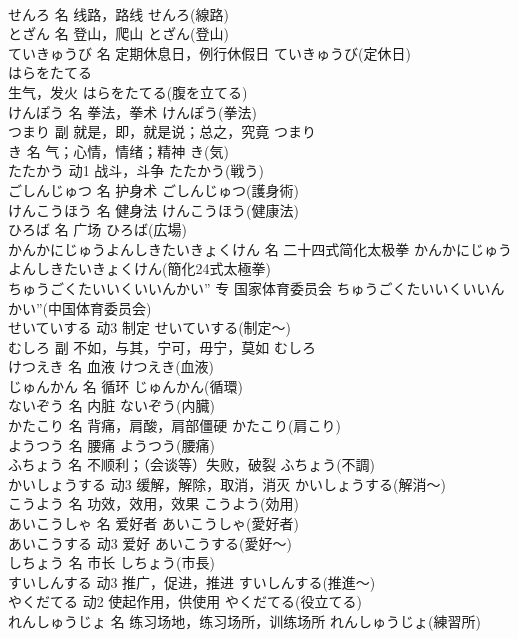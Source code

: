 \documentclass[8pt]{extreport}
\begin{document}
\begin{CJK}{UTF8}{min}
\\	せんろ	名	线路，路线	せんろ(線路)	
\\	とざん	名	登山，爬山	とざん(登山)	
\\	ていきゅうび	名	定期休息日，例行休假日	ていきゅうび(定休日)	
\\	はらをたてる	
\\	生气，发火	はらをたてる(腹を立てる)	
\\	けんぽう	名	拳法，拳术	けんぽう(拳法)	
\\	つまり	副	就是，即，就是说；总之，究竟	つまり	
\\	き	名	气；心情，情绪；精神	き(気)	
\\	たたかう	动1	战斗，斗争	たたかう(戦う)	
\\	ごしんじゅつ	名	护身术	ごしんじゅつ(護身術)	
\\	けんこうほう	名	健身法	けんこうほう(健康法)	
\\	ひろば	名	广场	ひろば(広場)	
\\	かんかにじゅうよんしきたいきょくけん	名	二十四式简化太极拳	かんかにじゅうよんしきたいきょくけん(簡化24式太極拳)	
\\	ちゅうごくたいいくいいんかい”	专	国家体育委员会	ちゅうごくたいいくいいんかい”(中国体育委员会)	
\\	せいていする	动3	制定	せいていする(制定～)	
\\	むしろ	副	不如，与其，宁可，毋宁，莫如	むしろ	
\\	けつえき	名	血液	けつえき(血液)	
\\	じゅんかん	名	循环	じゅんかん(循環)	
\\	ないぞう	名	内脏	ないぞう(内臓)	
\\	かたこり	名	背痛，肩酸，肩部僵硬	かたこり(肩こり)	
\\	ようつう	名	腰痛	ようつう(腰痛)	
\\	ふちょう	名	不顺利；（会谈等）失败，破裂	ふちょう(不調)	
\\	かいしょうする	动3	缓解，解除，取消，消灭	かいしょうする(解消～)	
\\	こうよう	名	功效，效用，效果	こうよう(効用)	
\\	あいこうしゃ	名	爱好者	あいこうしゃ(愛好者)	
\\	あいこうする	动3	爱好	あいこうする(愛好～)	
\\	しちょう	名	市长	しちょう(市長)	
\\	すいしんする	动3	推广，促进，推进	すいしんする(推進～)	
\\	やくだてる	动2	使起作用，供使用	やくだてる(役立てる)	
\\	れんしゅうじょ	名	练习场地，练习场所，训练场所	れんしゅうじょ(練習所)	

\end{CJK}
\end{document}
